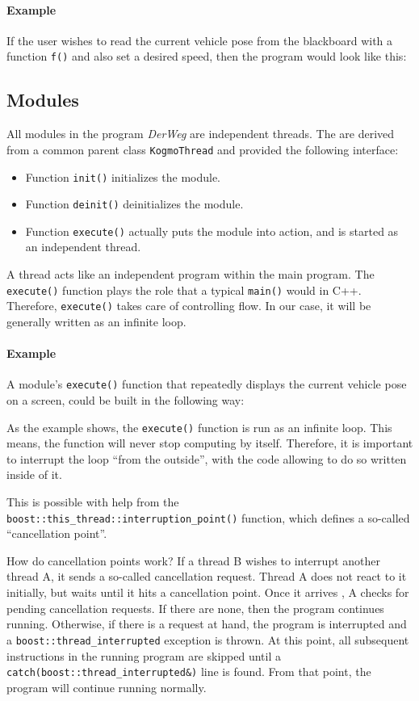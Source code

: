 \documentclass[a4paper, 11pt]{article}
\newcommand{\code}[1]{\texttt{#1}}
\newcommand{\codeex}[2][0.98\textwidth]{\vspace*{1ex}\noindent\fbox{\parbox{#1}{}}\vspace*{1ex}}
\newcommand{\DerWeg}{\textit{DerWeg }} %
\begin{document}
{\paragraph{Example}
If the user wishes to read the current vehicle pose from the blackboard with a function \code{f()} and also set a desired speed, then the program would look like this:

\codeex{beispielBlackboard.cpp}


\subsection{Modules}
All modules in the program \DerWeg are independent threads. The are derived from a common parent class \code{KogmoThread} and provided the following interface:
\begin{itemize}
\item Function \code{init()} initializes the module.
\item Function \code{deinit()} deinitializes the module.
\item Function \code{execute()} actually puts the module into action, and is started as an independent thread.
\end{itemize}

A thread acts like an independent program within the main program. The \code{execute()} function plays the role that a typical \code{main()} would in C++. Therefore, \code{execute()} takes care of controlling flow. In our case, it will be generally written as an infinite loop.

\paragraph{Example}
A module’s \code{execute()} function that repeatedly displays the current vehicle pose on a screen, could be built in the following way:

\codeex{beispielModulEinfach.cpp}

As the example shows, the \code{execute()} function is run as an infinite loop. This means, the function will never stop computing by itself. Therefore, it is important to interrupt the loop “from the outside”, with the code allowing to do so written inside of it.

This is possible with help from the \code{boost::this\_thread::interruption\_point()} function, which defines a so-called “cancellation point”.

How do cancellation points work? If a thread B wishes to interrupt another thread A, it sends a so-called cancellation request. Thread A does not react to it initially, but waits until it hits a cancellation point. Once it arrives , A checks for pending cancellation requests. If there are none, then the program continues running. Otherwise, if there is a request at hand, the program is interrupted and a \code{boost::thread\_interrupted} exception is thrown. At this point, all subsequent instructions in the running program are skipped until a \code{catch(boost::thread\_interrupted\&)} line is found. From that point, the program will continue running normally. 

}
\end{document}
